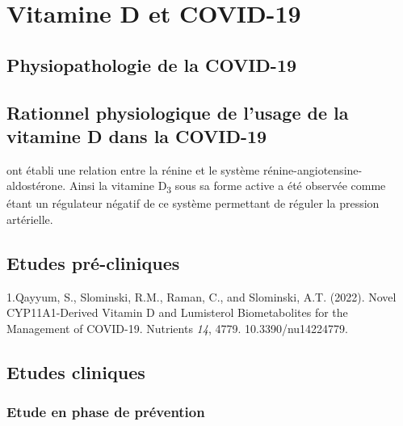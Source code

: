 \documentclass[
  a4paper,
  DIV=11,
  numbers=noendperiod,
  listof=totoc]{scrreprt}
\begin{document}
\newpage{}

\hypertarget{vitamine-d-et-covid-19}{%
\chapter{Vitamine D et COVID-19}\label{vitamine-d-et-covid-19}}

\hypertarget{physiopathologie-de-la-covid-19}{%
\section{Physiopathologie de la
COVID-19}\label{physiopathologie-de-la-covid-19}}

\hypertarget{rationnel-physiologique-de-lusage-de-la-vitamine-d-dans-la-covid-19}{%
\section{Rationnel physiologique de l'usage de la vitamine D dans la
COVID-19}\label{rationnel-physiologique-de-lusage-de-la-vitamine-d-dans-la-covid-19}}

\textcite{Li.2002} ont établi une relation entre la rénine et le système
rénine-angiotensine-aldostérone. Ainsi la vitamine D\textsubscript{3}
sous sa forme active a été observée comme étant un régulateur négatif de
ce système permettant de réguler la pression artérielle.

\hypertarget{etudes-pruxe9-cliniques}{%
\section{Etudes pré-cliniques}\label{etudes-pruxe9-cliniques}}

1.Qayyum, S., Slominski, R.M., Raman, C., and Slominski, A.T. (2022).
Novel CYP11A1-Derived Vitamin D and Lumisterol Biometabolites for the
Management of COVID-19. Nutrients \emph{14}, 4779. 10.3390/nu14224779.

\hypertarget{etudes-cliniques}{%
\section{Etudes cliniques}\label{etudes-cliniques}}

\hypertarget{etude-en-phase-de-pruxe9vention}{%
\subsection{Etude en phase de
prévention}\label{etude-en-phase-de-pruxe9vention}}
\end{document}

